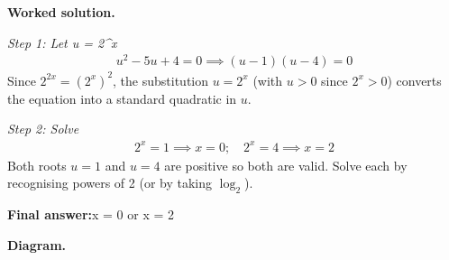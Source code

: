 \documentclass[11pt]{article}
\begin{document}
\textbf{Worked solution.}

\textit{Step 1: Let u = 2\textasciicircum x}
\[\begin{gathered}
u^2 - 5u + 4 = 0 \implies (u-1)(u-4) = 0
\end{gathered}\]
Since \( 2^{2x} = (2^x)^2 \), the substitution \( u = 2^x \) (with \( u > 0 \) since \( 2^x > 0 \)) converts the equation into a standard quadratic in \( u \).

\textit{Step 2: Solve}
\[\begin{gathered}
2^x = 1 \implies x = 0; \quad 2^x = 4 \implies x = 2
\end{gathered}\]
Both roots \( u = 1 \) and \( u = 4 \) are positive so both are valid. Solve each by recognising powers of 2 (or by taking \( \log_2 \)).

\begin{answerbox}
\textbf{Final answer:}\quad x = 0 or x = 2
\end{answerbox}
\textbf{Diagram.}
\end{document}
